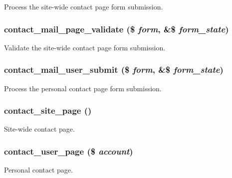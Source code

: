 Process the site-wide contact page form submission. \hypertarget{contact_8pages_8inc_e236d6c9b3d50da9ed4ca7164eee5b3a}{
\subsubsection[{contact\_\-mail\_\-page\_\-validate}]{\setlength{\rightskip}{0pt plus 5cm}contact\_\-mail\_\-page\_\-validate (\$ {\em form}, \/  \&\$ {\em form\_\-state})}}
\label{contact_8pages_8inc_e236d6c9b3d50da9ed4ca7164eee5b3a}


Validate the site-wide contact page form submission. \hypertarget{contact_8pages_8inc_54662925fe803bb08562c88bba0b2582}{
\subsubsection[{contact\_\-mail\_\-user\_\-submit}]{\setlength{\rightskip}{0pt plus 5cm}contact\_\-mail\_\-user\_\-submit (\$ {\em form}, \/  \&\$ {\em form\_\-state})}}
\label{contact_8pages_8inc_54662925fe803bb08562c88bba0b2582}


Process the personal contact page form submission. \hypertarget{contact_8pages_8inc_468e4e896bff41566960b9061993c9c2}{
\subsubsection[{contact\_\-site\_\-page}]{\setlength{\rightskip}{0pt plus 5cm}contact\_\-site\_\-page ()}}
\label{contact_8pages_8inc_468e4e896bff41566960b9061993c9c2}


Site-wide contact page. \hypertarget{contact_8pages_8inc_64cbb5319d9172b493157b32d2d996af}{
\subsubsection[{contact\_\-user\_\-page}]{\setlength{\rightskip}{0pt plus 5cm}contact\_\-user\_\-page (\$ {\em account})}}
\label{contact_8pages_8inc_64cbb5319d9172b493157b32d2d996af}


Personal contact page. 